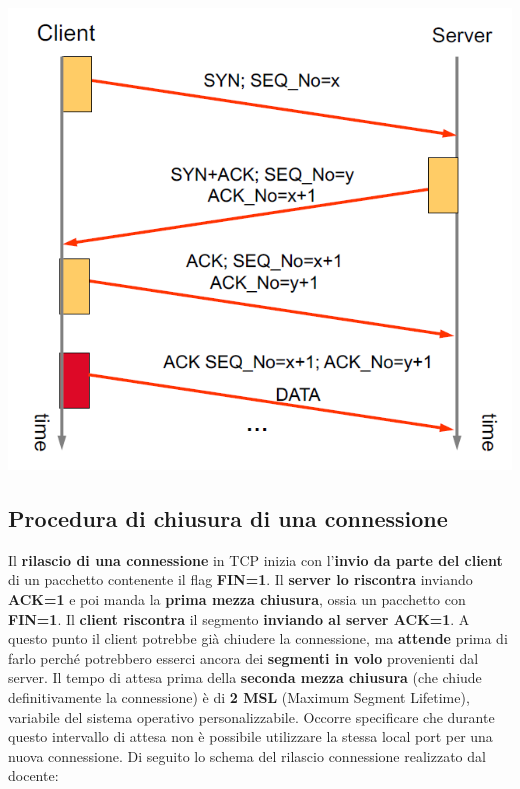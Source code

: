 \documentclass[12pt]{article}
\begin{document}
\begin{center}
    \includegraphics[scale=0.6]{tcp_handshake}
\end{center}

\subsection{Procedura di chiusura di una connessione}

Il \textbf{rilascio di una connessione} in TCP inizia con l'\textbf{invio da parte del client} di un pacchetto contenente il flag \textbf{FIN=1}. Il \textbf{server lo riscontra} inviando \textbf{ACK=1} e poi manda la \textbf{prima mezza chiusura}, ossia un pacchetto con \textbf{FIN=1}. Il \textbf{client riscontra} il segmento \textbf{inviando al server ACK=1}. A questo punto il client potrebbe già chiudere la connessione, ma \textbf{attende} prima di farlo perché potrebbero esserci ancora dei \textbf{segmenti in volo} provenienti dal server. Il tempo di attesa prima della \textbf{seconda mezza chiusura} (che chiude definitivamente la connessione) è di \textbf{2 MSL} (Maximum Segment Lifetime), variabile del sistema operativo personalizzabile. Occorre specificare che durante questo intervallo di attesa non è possibile utilizzare la stessa local port per una nuova connessione. Di seguito lo schema del rilascio connessione realizzato dal docente:
\end{document}

